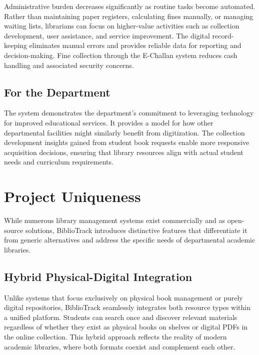 \documentclass[12pt,a4paper]{report}
\begin{document}
Administrative burden decreases significantly as routine tasks become automated. Rather than maintaining paper registers, calculating fines manually, or managing waiting lists, librarians can focus on higher-value activities such as collection development, user assistance, and service improvement. The digital record-keeping eliminates manual errors and provides reliable data for reporting and decision-making. Fine collection through the E-Challan system reduces cash handling and associated security concerns.

\subsection{For the Department}

The system demonstrates the department's commitment to leveraging technology for improved educational services. It provides a model for how other departmental facilities might similarly benefit from digitization. The collection development insights gained from student book requests enable more responsive acquisition decisions, ensuring that library resources align with actual student needs and curriculum requirements.

\section{Project Uniqueness}
\label{sec:uniqueness}

While numerous library management systems exist commercially and as open-source solutions, BiblioTrack introduces distinctive features that differentiate it from generic alternatives and address the specific needs of departmental academic libraries.

\subsection{Hybrid Physical-Digital Integration}

Unlike systems that focus exclusively on physical book management or purely digital repositories, BiblioTrack seamlessly integrates both resource types within a unified platform. Students can search once and discover relevant materials regardless of whether they exist as physical books on shelves or digital PDFs in the online collection. This hybrid approach reflects the reality of modern academic libraries, where both formats coexist and complement each other.
\end{document}
